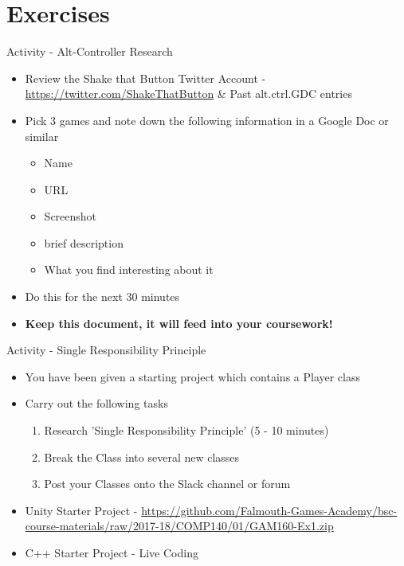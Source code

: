 \part{Exercises}
\frame{\partpage}

\begin{frame}{Activity - Alt-Controller Research}
	\begin{itemize}
		\pause \item Review the Shake that Button Twitter Account - \url{https://twitter.com/ShakeThatButton} \& Past alt.ctrl.GDC entries
		\pause \item Pick 3 games and note down the following information in a Google Doc or similar
		\begin{itemize}
			\pause\item Name
			\item URL
			\item Screenshot
			\item brief description
			\item What you find interesting about it 
		\end{itemize}
		\pause \item Do this for the next 30 minutes
		\pause \item \textbf{Keep this document, it will feed into your coursework!}
	\end{itemize}
\end{frame}

\begin{frame}{Activity - Single Responsibility Principle}
\begin{itemize}
	\pause \item You have been given a starting project which contains a Player class
	\pause \item Carry out the following tasks
	\begin{enumerate}
		\pause \item Research 'Single Responsibility Principle' (5 - 10 minutes)
		\pause \item Break the Class into several new classes
		\pause \item Post your Classes onto the Slack channel or forum  
	\end{enumerate} 
	\pause \item Unity Starter Project - \url{https://github.com/Falmouth-Games-Academy/bsc-course-materials/raw/2017-18/COMP140/01/GAM160-Ex1.zip}
	\pause \item C++ Starter Project - Live Coding
\end{itemize}
\end{frame}